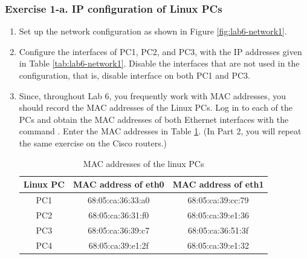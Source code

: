 \subsubsection{Exercise 1-a. IP configuration of Linux PCs}
\begin{enumerate}
	\item Set up the network configuration as shown in Figure \ref{fig:lab6-network1}.
	\item Configure the interfaces of PC1, PC2, and PC3, with the IP addresses given in Table \ref{tab:lab6-network1}. Disable the interfaces that are not used in the configuration, that is, disable interface  on both PC1 and PC3.
	\item Since, throughout Lab 6, you frequently work with MAC addresses, you should record the MAC addresses of the Linux PCs. Log in to each of the PCs and obtain the MAC addresses of both Ethernet interfaces with the command . Enter the MAC addresses in Table \ref{tab:lab6-macs-pcs}. (In Part 2, you will repeat the same exercise on the Cisco routers.)
		\begin{table}[h!t]
			\centering
			\begin{tabular}{| c | c | c |}
				\hline
				\textbf{Linux PC} & \textbf{MAC address of eth0} & \textbf{MAC address of eth1} \\ \hline
				PC1 & 68:05:ca:36:33:a0 & 68:05:ca:39:cc:79 \\
				PC2 & 68:05:ca:36:31:f0 & 68:05:ca:39:e1:36 \\
				PC3 & 68:05:ca:36:39:c7 & 68:05:ca:36:51:3f  \\
				PC4 & 68:05:ca:39:e1:2f & 68:05:ca:39:e1:32 \\ \hline
			\end{tabular}
			\caption{MAC addresses of the linux PCs}
			\label{tab:lab6-macs-pcs}
		\end{table}
\end{enumerate}

